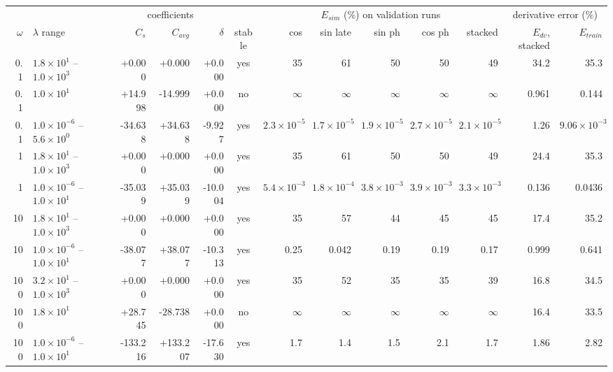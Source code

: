 \begin{tabular}{rlrrrc|rrrr|r|rr}\toprule
 & & \multicolumn{3}{c}{coefficients} & & \multicolumn{5}{c|}{$E_{sim}$ (\%) on validation runs} & \multicolumn{2}{c}{derivative error (\%)}\\
$\omega$ & $\lambda$ range & $C_s$ & $C_{avg}$ & $\delta$ & stable & cos & sin late & sin ph & cos ph & stacked & $E_{dv}$, stacked & $E_{train}$\\\midrule
0.1 & $1.8\!\times\!10^{1}$ -- $1.0\!\times\!10^{3}$ & +0.000 & +0.000 & +0.000 & yes & 35 & 61 & 50 & 50 & 49 & 34.2 & 35.3\\
0.1 & $1.0\!\times\!10^{1}$ & +14.998 & -14.999 & +0.000 & no & $\infty$ & $\infty$ & $\infty$ & $\infty$ & $\infty$ & 0.961 & 0.144\\
\rowcolor{sel}0.1 & $1.0\!\times\!10^{-6}$ -- $5.6\!\times\!10^{0}$ & -34.638 & +34.638 & -9.927 & yes & $2.3\!\times\!10^{-5}$ & $1.7\!\times\!10^{-5}$ & $1.9\!\times\!10^{-5}$ & $2.7\!\times\!10^{-5}$ & $2.1\!\times\!10^{-5}$ & 1.26 & $9.06\!\times\!10^{-3}$\\
\midrule
1 & $1.8\!\times\!10^{1}$ -- $1.0\!\times\!10^{3}$ & +0.000 & +0.000 & +0.000 & yes & 35 & 61 & 50 & 50 & 49 & 24.4 & 35.3\\
\rowcolor{sel}1 & $1.0\!\times\!10^{-6}$ -- $1.0\!\times\!10^{1}$ & -35.039 & +35.039 & -10.004 & yes & $5.4\!\times\!10^{-3}$ & $1.8\!\times\!10^{-4}$ & $3.8\!\times\!10^{-3}$ & $3.9\!\times\!10^{-3}$ & $3.3\!\times\!10^{-3}$ & 0.136 & 0.0436\\
\midrule
10 & $1.8\!\times\!10^{1}$ -- $1.0\!\times\!10^{3}$ & +0.000 & +0.000 & +0.000 & yes & 35 & 57 & 44 & 45 & 45 & 17.4 & 35.2\\
\rowcolor{sel}10 & $1.0\!\times\!10^{-6}$ -- $1.0\!\times\!10^{1}$ & -38.077 & +38.077 & -10.313 & yes & 0.25 & 0.042 & 0.19 & 0.19 & 0.17 & 0.999 & 0.641\\
\midrule
100 & $3.2\!\times\!10^{1}$ -- $1.0\!\times\!10^{3}$ & +0.000 & +0.000 & +0.000 & yes & 35 & 52 & 35 & 35 & 39 & 16.8 & 34.5\\
100 & $1.8\!\times\!10^{1}$ & +28.745 & -28.738 & +0.000 & no & $\infty$ & $\infty$ & $\infty$ & $\infty$ & $\infty$ & 16.4 & 33.5\\
\rowcolor{sel}100 & $1.0\!\times\!10^{-6}$ -- $1.0\!\times\!10^{1}$ & -133.216 & +133.207 & -17.630 & yes & 1.7 & 1.4 & 1.5 & 2.1 & 1.7 & 1.86 & 2.82\\
\bottomrule\end{tabular}